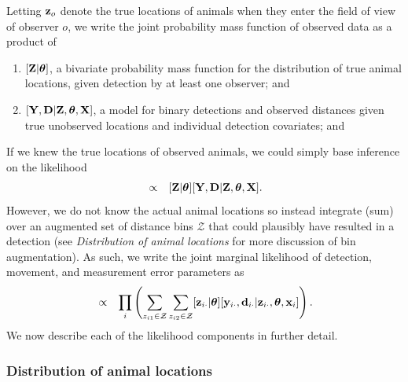 \documentclass[12pt,fleqn]{article}
\begin{document}
Letting ${\bf z}_o$ denote the true locations of animals when they enter the field of view of observer $o$, we write the joint probability mass function of observed data as a product of
\begin{enumerate}
   \item $[{\bf Z}|\boldsymbol{\theta}]$, a bivariate probability mass function for the distribution of true animal locations, given detection by at least one observer; and
   \item $[{\bf Y},{\bf D}|{\bf Z},\boldsymbol{\theta},{\bf X}]$, a model for binary detections and observed distances given true unobserved locations and individual detection covariates; and
\end{enumerate}
If we knew the true locations of observed animals, we could simply base inference on the likelihood
\begin{eqnarray*}
  [\boldsymbol{\theta} | {\bf Y},{\bf D}, {\bf X}] & \propto & [{\bf Z}|\boldsymbol{\theta}][{\bf Y},{\bf D}|{\bf Z},\boldsymbol{\theta},{\bf X}].
\end{eqnarray*}
However, we do not know the actual animal locations so instead integrate (sum) over an augmented set of distance bins $\mathcal{Z}$ that could plausibly have resulted in a detection (see \textit{Distribution of animal locations} for more discussion of bin augmentation).
As such, we write the joint marginal likelihood of detection, movement, and measurement error parameters as
\begin{eqnarray}
  [\boldsymbol{\theta} | {\bf Y},{\bf D}, {\bf X}] & \propto & \prod_i \left( \sum_{z_{i1} \in \mathcal{Z}} \sum_{z_{i2} \in \mathcal{Z}} [{\bf z}_{i \cdot} |\boldsymbol{\theta}][{\bf y}_{i \cdot},{\bf d}_{i \cdot}|{\bf z}_{i \cdot} , \boldsymbol{\theta} , {\bf x}_i]
   \right).
  \label{eq:lik}
\end{eqnarray}
We now describe each of the likelihood components in further detail.

\subsubsection{Distribution of animal locations}
\end{document}
